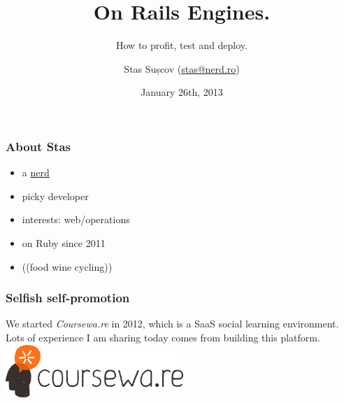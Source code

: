 \documentclass[compress]{beamer}
\title{On Rails Engines.}
\subtitle{How to profit, test and deploy.}
\author{Stas Sușcov (\href{mailto:stas@nerd.ro}{stas@nerd.ro})}
\date{January 26th, 2013}
\institute{GeekMeet \#14, Cluj-Napoca, Transylvania}
\begin{document}
\maketitle

\begin{frame}
\frametitle{About Stas}

\begin{itemize}
  \item a \href{http://stas.nerd.ro}{nerd}
  \item picky developer
  \item interests: web/operations
  \item on Ruby since 2011
  \item (\Heart (food wine cycling))
\end{itemize}
\end{frame}

\begin{frame}
\frametitle{Selfish self-promotion}
  \begin{center}
    \huge We started \emph{Coursewa.re} in 2012, which is a SaaS social learning environment.
    \\
    \small Lots of experience I am sharing today comes from building this platform.
    \colorbox{solarizedBase3}{\includegraphics[height=2cm]{courseware.png}}
  \end{center}
\end{frame}
\end{document}
